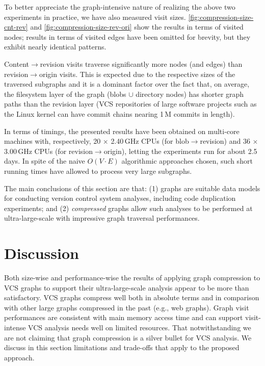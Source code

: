 \smallskip

To better appreciate the graph-intensive nature of realizing the above two
experiments in practice, we have also measured visit sizes.
\cref{fig:compression-size-cnt-rev} and \cref{fig:compression-size-rev-ori}
show the results in terms of visited nodes; results in terms of visited edges
have been omitted for brevity, but they exhibit nearly identical patterns.

Content$\to$revision visits traverse significantly more nodes (and edges) than
revision$\to$origin visits. This is expected due to the respective sizes of the
traversed subgraphs and it is a dominant
factor over the fact that, on average, the filesystem layer of the graph
(blobs $\cup$ directory nodes) has shorter graph paths than the revision
layer (VCS repositories of large software projects such as the Linux kernel can
have commit chains nearing 1\,M commits in length).

\smallskip

In terms of timings, the presented results have been obtained on multi-core
machines with, respectively, 20 $\times$ 2.40\,GHz CPUs (for
blob$\to$revision) and 36 $\times$ 3.00\,GHz CPUs (for revision$\to$origin),
letting the experiments run for about 2.5 days. In spite of the naive $O(V\cdot
E)$ algorithmic approaches chosen, such short running times have allowed to
process very large subgraphs.

\smallskip

The main conclusions of this section are that: (1) graphs are suitable data
models for conducting version control system analyses, including code
duplication experiments; and (2) \emph{compressed} graphs allow such analyses
to be performed at ultra-large-scale with impressive graph traversal
performances.

\section{Discussion}%
\label{sec:compression-discussion}

Both size-wise and performance-wise the results of applying graph compression
to VCS graphs to support their ultra-large-scale analysis appear to be more
than satisfactory. VCS graphs compress well both in absolute terms and in
comparison with other large graphs compressed in the past (e.g., web graphs).
Graph visit performances are consistent with main memory access time and can
support visit-intense VCS analysis needs well on limited resources.
%
That notwithstanding we are not claiming that graph compression is a silver
bullet for VCS analysis. We discuss in this section limitations and trade-offs
that apply to the proposed approach.



